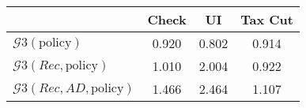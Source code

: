 \begin{tabular}{@{}lccc@{}} 
\toprule 
                          & Check      & UI    & Tax Cut    \\  \midrule 
$\mathcal{G}3(\text{policy})$ & 0.920  & 0.802  & 0.914     \\ 
$\mathcal{G}3(Rec,\text{policy})$ & 1.010  & 2.004  & 0.922     \\ 
$\mathcal{G}3(Rec, AD,\text{policy})$ & 1.466  & 2.464  & 1.107     \\ 
\end{tabular}  
